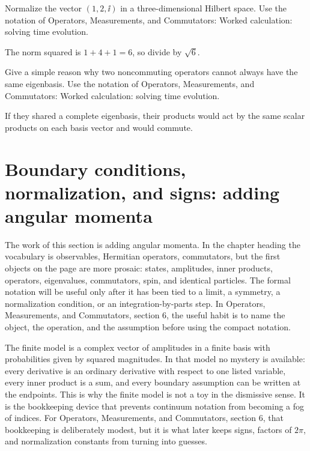 \begin{exercise}
Normalize the vector \((1,2,\ii)\) in a three-dimensional Hilbert space.  Use the notation of Operators, Measurements, and Commutators: Worked calculation: solving time evolution.
\begin{answer}
The norm squared is \(1+4+1=6\), so divide by \(\sqrt6\).
\end{answer}
\end{exercise}

\begin{exercise}
Give a simple reason why two noncommuting operators cannot always have the same eigenbasis.  Use the notation of Operators, Measurements, and Commutators: Worked calculation: solving time evolution.
\begin{answer}
If they shared a complete eigenbasis, their products would act by the same scalar products on each basis vector and would commute.
\end{answer}
\end{exercise}



\section{Boundary conditions, normalization, and signs: adding angular momenta}

The work of this section is adding angular momenta.  In the chapter heading the vocabulary is observables, Hermitian operators, commutators, but the first objects on the page are more prosaic: states, amplitudes, inner products, operators, eigenvalues, commutators, spin, and identical particles.  The formal notation will be useful only after it has been tied to a limit, a symmetry, a normalization condition, or an integration-by-parts step.  In Operators, Measurements, and Commutators, section 6, the useful habit is to name the object, the operation, and the assumption before using the compact notation.

The finite model is a complex vector of amplitudes in a finite basis with probabilities given by squared magnitudes.  In that model no mystery is available: every derivative is an ordinary derivative with respect to one listed variable, every inner product is a sum, and every boundary assumption can be written at the endpoints.  This is why the finite model is not a toy in the dismissive sense.  It is the bookkeeping device that prevents continuum notation from becoming a fog of indices.  For Operators, Measurements, and Commutators, section 6, that bookkeeping is deliberately modest, but it is what later keeps signs, factors of \(2\pi\), and normalization constants from turning into guesses.

